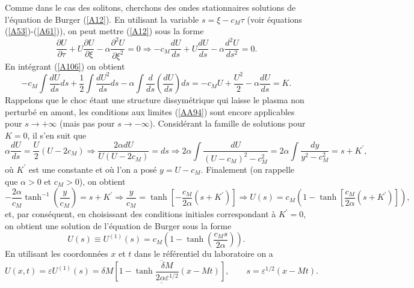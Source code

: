 \documentclass[10pt,thmsa]{article}
\begin{document}
Comme dans le cas des solitons, cherchons des ondes stationnaires solutions de
l'\'{e}quation de Burger (\ref{A12}). En utilisant la variable $s=\xi
-c_{M}\tau$ (voir \'{e}quations (\ref{A53})-(\ref{A61})), on peut mettre
(\ref{A12}) sous la forme
\begin{equation}
\frac{\partial U}{\partial\tau}+U\frac{\partial U}{\partial\xi}-\alpha
\frac{\partial^{2}U}{\partial\xi^{2}}=0\Rightarrow-c_{M}\frac{dU}{ds}%
+U\frac{dU}{ds}-\alpha\frac{d^{2}U}{ds^{2}}=0.\label{A106}%
\end{equation}
En int\'{e}grant (\ref{A106}) on obtient
\begin{equation}
-c_{M}\int\frac{dU}{ds}ds+\frac{1}{2}\int\frac{dU^{2}}{ds}ds-\alpha\int%
\frac{d}{ds}\left(  \frac{dU}{ds}\right)  ds=-c_{M}U+\frac{U^{2}}{2}%
-\alpha\frac{dU}{ds}=K.\label{A107}%
\end{equation}
Rappelons que le choc \'{e}tant une structure dissym\'{e}trique qui laisse le
plasma non perturb\'{e} en amont, les conditions aux limites (\ref{AA94}) sont
encore applicables pour $s\rightarrow+\infty$ (mais pas pour $s\rightarrow
-\infty$). Consid\'{e}rant la famille de solutions pour $K=0$, il s'en suit
que
\begin{equation}
\alpha\frac{dU}{ds}=\frac{U}{2}(U-2c_{M})\Rightarrow\frac{2\alpha
dU}{U(U-2c_{M})}=ds\Rightarrow2\alpha\int\frac{dU}{(U-c_{M})^{2}-c_{M}^{2}%
}=2\alpha\int\frac{dy}{y^{2}-c_{M}^{2}}=s+K^{\prime},\label{A108}%
\end{equation}
o\`{u} $K^{\prime}$ est une constante et o\`{u} l'on a pos\'{e} $y=U-c_{M}$.
Finalement (on rappelle que $\alpha>0$ et $c_{M}>0$), on obtient
\begin{equation}
-\frac{2\alpha}{c_{M}}\tanh^{-1}\left(  \frac{y}{c_{M}}\right)  =s+K^{\prime
}\Rightarrow\frac{y}{c_{M}}=\tanh\left[  -\frac{c_{M}}{2\alpha}(s+K^{\prime
})\right]  \Rightarrow U(s)=c_{M}(1-\tanh\left[  \frac{c_{M}}{2\alpha
}(s+K^{\prime})\right]  ),\label{A109}%
\end{equation}
et, par cons\'{e}quent, en choisissant des conditions initiales correspondant
\`{a} $K^{\prime}=0$, on obtient une solution de l'\'{e}quation de Burger sous
la forme
\begin{equation}
U(s)\equiv U^{(1)}(s)=c_{M}(1-\tanh\left(  \frac{c_{M}s}{2\alpha}\right)
).\label{A110}%
\end{equation}
En utilisant les coordonn\'{e}es $x$ et $t$ dans le r\'{e}f\'{e}rentiel du
laboratoire on a
\begin{equation}
\underline{\overline{U(x,t)=\varepsilon U^{(1)}(s)=\delta M\left[
1-\tanh\frac{\delta M}{2\alpha\varepsilon^{1/2}}(x-Mt)\right]  ,\qquad
s=\varepsilon^{1/2}(x-Mt).}}\label{A111}%
\end{equation}
\end{document}
